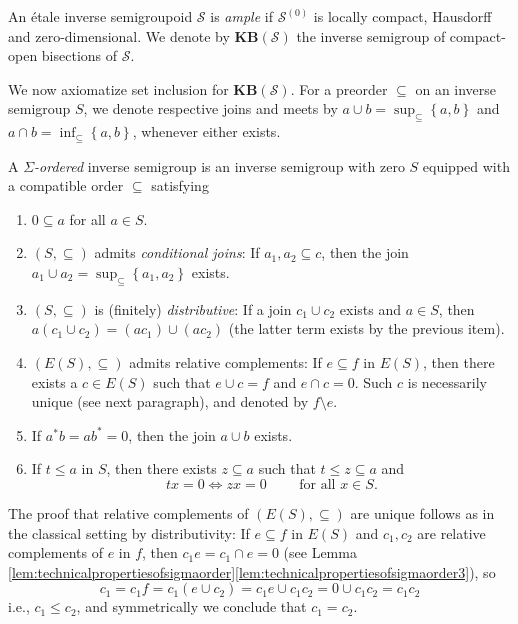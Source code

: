 \begin{definition}
    An étale inverse semigroupoid $\mathcal{S}$ is \emph{ample} if $\mathcal{S}^{(0)}$ is locally compact, Hausdorff and zero-dimensional. We denote by $\mathbf{KB}(\mathcal{S})$ the inverse semigroup of compact-open bisections of $\mathcal{S}$.
\end{definition}

We now axiomatize set inclusion for $\mathbf{KB}(\mathcal{S})$. For a preorder $\subseteq$ on an inverse semigroup $S$, we denote respective joins and meets by $a\cup b=\sup_{\subseteq}\left\{a,b\right\}$ and $a\cap b=\inf_{\subseteq}\left\{a,b\right\}$, whenever either exists.

\begin{definition}\label{def:sigmaorder}
A \emph{$\Sigma$-ordered} inverse semigroup is an inverse semigroup with zero $S$ equipped with a compatible order $\subseteq$ satisfying
\begin{enumerate}[label=({$\Sigma$-}\roman*)]
    \item\label{def:sigmaorder.0minimum} $0\subseteq a$ for all $a\in S$.
    \item\label{def:sigmaorder.conditionaljoins} $(S,\subseteq)$ admits \emph{conditional joins}: If $a_1,a_2\subseteq c$, then the join $a_1\cup a_2=\sup_{\subseteq}\left\{a_1,a_2\right\}$ exists.
    \item\label{def:sigmaorder.distributivity} $(S,\subseteq)$ is (finitely) \emph{distributive}: If a join $c_1\cup c_2$ exists and $a\in S$, then $a(c_1\cup c_2)=(ac_1)\cup (ac_2)$ (the latter term exists by the previous item).
    \item\label{def:sigmaorder.ESrelativecomplements} $(E(S),\subseteq)$ admits relative complements: If $e\subseteq f$ in $E(S)$, then there exists a $c\in E(S)$ such that $e\cup c=f$ and $e\cap c=0$. Such $c$ is necessarily unique (see next paragraph), and denoted by $f\setminus e$.
    \item\label{def:sigmaorder.zerojoins} If $a^*b=ab^*=0$, then the join $a\cup b$ exists.
    \item\label{def:sigmaorder.interpolation} If $t\leq a$ in $S$, then there exists $z\subseteq a$ such that $t\leq z\subseteq a$ and
    \[tx=0\iff zx=0\qquad\text{ for all }x\in S.\]
\end{enumerate}
\end{definition}

The proof that relative complements of $(E(S),\subseteq)$ are unique follows as in the classical setting by distributivity: If $e\subseteq f$ in $E(S)$ and $c_1,c_2$ are relative complements of $e$ in $f$, then $c_1e=c_1\cap e=0$ (see Lemma \ref{lem:technicalpropertiesofsigmaorder}\ref{lem:technicalpropertiesofsigmaorder3}), so
\[c_1=c_1f=c_1(e\cup c_2)=c_1e\cup c_1c_2=0\cup c_1c_2=c_1c_2\]
i.e., $c_1\leq c_2$, and symmetrically we conclude that $c_1=c_2$.

